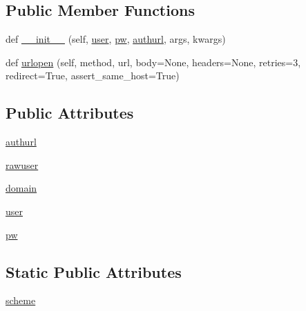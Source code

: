 \subsection*{Public Member Functions}
\begin{DoxyCompactItemize}
\item 
def \hyperlink{classpip_1_1__vendor_1_1urllib3_1_1contrib_1_1ntlmpool_1_1NTLMConnectionPool_a0febfa0b4affbf6ce568fc420c705a49}{\+\_\+\+\_\+init\+\_\+\+\_\+} (self, \hyperlink{classpip_1_1__vendor_1_1urllib3_1_1contrib_1_1ntlmpool_1_1NTLMConnectionPool_aaa51ccd7ff0b8bd7a15bd36ecfca4822}{user}, \hyperlink{classpip_1_1__vendor_1_1urllib3_1_1contrib_1_1ntlmpool_1_1NTLMConnectionPool_a81b09c363fdf7f3f7ab54cd9228458db}{pw}, \hyperlink{classpip_1_1__vendor_1_1urllib3_1_1contrib_1_1ntlmpool_1_1NTLMConnectionPool_a952bffabd8ee2bd4a9e62a0bd41f137f}{authurl}, args, kwargs)
\item 
def \hyperlink{classpip_1_1__vendor_1_1urllib3_1_1contrib_1_1ntlmpool_1_1NTLMConnectionPool_a623f3d73de05c5e06039781aef1b82c5}{urlopen} (self, method, url, body=None, headers=None, retries=3, redirect=True, assert\+\_\+same\+\_\+host=True)
\end{DoxyCompactItemize}
\subsection*{Public Attributes}
\begin{DoxyCompactItemize}
\item 
\hyperlink{classpip_1_1__vendor_1_1urllib3_1_1contrib_1_1ntlmpool_1_1NTLMConnectionPool_a952bffabd8ee2bd4a9e62a0bd41f137f}{authurl}
\item 
\hyperlink{classpip_1_1__vendor_1_1urllib3_1_1contrib_1_1ntlmpool_1_1NTLMConnectionPool_a2228dfc9385864dcc54b389e7ad7eb97}{rawuser}
\item 
\hyperlink{classpip_1_1__vendor_1_1urllib3_1_1contrib_1_1ntlmpool_1_1NTLMConnectionPool_ab7ba116622276593074fcd979872d166}{domain}
\item 
\hyperlink{classpip_1_1__vendor_1_1urllib3_1_1contrib_1_1ntlmpool_1_1NTLMConnectionPool_aaa51ccd7ff0b8bd7a15bd36ecfca4822}{user}
\item 
\hyperlink{classpip_1_1__vendor_1_1urllib3_1_1contrib_1_1ntlmpool_1_1NTLMConnectionPool_a81b09c363fdf7f3f7ab54cd9228458db}{pw}
\end{DoxyCompactItemize}
\subsection*{Static Public Attributes}
\begin{DoxyCompactItemize}
\item 
\hyperlink{classpip_1_1__vendor_1_1urllib3_1_1contrib_1_1ntlmpool_1_1NTLMConnectionPool_a9f8fbbc6cdce31015fd4bf708d95509c}{scheme}
\end{DoxyCompactItemize}


